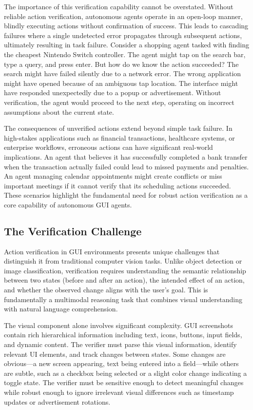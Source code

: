 \documentclass[11pt,a4paper]{article}
\begin{document}
The importance of this verification capability cannot be overstated. Without reliable action verification, autonomous agents operate in an open-loop manner, blindly executing actions without confirmation of success. This leads to cascading failures where a single undetected error propagates through subsequent actions, ultimately resulting in task failure. Consider a shopping agent tasked with finding the cheapest Nintendo Switch controller. The agent might tap on the search bar, type a query, and press enter. But how do we know the action succeeded? The search might have failed silently due to a network error. The wrong application might have opened because of an ambiguous tap location. The interface might have responded unexpectedly due to a popup or advertisement. Without verification, the agent would proceed to the next step, operating on incorrect assumptions about the current state.

The consequences of unverified actions extend beyond simple task failure. In high-stakes applications such as financial transactions, healthcare systems, or enterprise workflows, erroneous actions can have significant real-world implications. An agent that believes it has successfully completed a bank transfer when the transaction actually failed could lead to missed payments and penalties. An agent managing calendar appointments might create conflicts or miss important meetings if it cannot verify that its scheduling actions succeeded. These scenarios highlight the fundamental need for robust action verification as a core capability of autonomous GUI agents.

\subsection{The Verification Challenge}

Action verification in GUI environments presents unique challenges that distinguish it from traditional computer vision tasks. Unlike object detection or image classification, verification requires understanding the semantic relationship between two states (before and after an action), the intended effect of an action, and whether the observed change aligns with the user's goal. This is fundamentally a multimodal reasoning task that combines visual understanding with natural language comprehension.

The visual component alone involves significant complexity. GUI screenshots contain rich hierarchical information including text, icons, buttons, input fields, and dynamic content. The verifier must parse this visual information, identify relevant UI elements, and track changes between states. Some changes are obvious---a new screen appearing, text being entered into a field---while others are subtle, such as a checkbox being selected or a slight color change indicating a toggle state. The verifier must be sensitive enough to detect meaningful changes while robust enough to ignore irrelevant visual differences such as timestamp updates or advertisement rotations.
\end{document}
